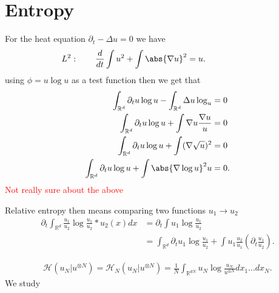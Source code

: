 \section{Entropy}
\begin{definition}[Entropy]
 For the heat equation $\partial_t - \Delta  u = 0$ we have 
 \begin{align*}
   \hspace{-20mm} L^2 :\qquad \frac{d}{dt} \int  u ^2 + \int  \abs{\nabla u}^2  = u
 .\end{align*}
using $\phi  = u \log u$ as a test function then  we get that 
\begin{align*}
  \int_{\mathbb{R}^{d} } \partial_t u \log u - \int_{\mathbb{R}^{d} } \Delta  u \log_u  &= 0\\
  \int_{\mathbb{R}^{d} } \partial_t u \log u + \int  \nabla u \frac{\nabla u}{u} &=0 \\
  \int_{\mathbb{R}^{d} } \partial_t u \log u +   \int (\nabla \sqrt{u} )^2  &=0 \\
  \int_{\mathbb{R}^{d} } \partial_t u \log u +  \int  \abs{\nabla \log u} ^2 u &=0 
.\end{align*}
\textcolor{Red}{Not really sure about the above }
\end{definition}
\begin{definition}
 Relative entropy then means comparing two functions $u_1 \to u_{2}$  
 \begin{align*}
   \partial_t \int_{\mathbb{R}^{d} }\frac{u_{1}}{u_{2}} \log \frac{u_{1}}{u_{2}}*u_{2}(x) dx &= \partial_t \int u_{1} \log \frac{u_{1}}{u_{2}}\\
                                                                                             &= \int_{\mathbb{R}^{d} } \partial_t u_{1} \log \frac{u_{1}}{u_{2}} + \int u_{1} \frac{u_{2}}{u_{1}}(\partial_t \frac{u_{1}}{u_{2}}) 
 .\end{align*}
\end{definition}
\begin{align*}
  \mathcal{H}(u_N | u^{\otimes N}) = \mathcal{H}_N(u_N | u^{\otimes N} ) = \frac{1}{N} \int_{\mathbb{R}^{dN} } u_N \log \frac{u_N}{u^{\otimes N} }   dx_{1}\ldots dx_N
.\end{align*}
We study
